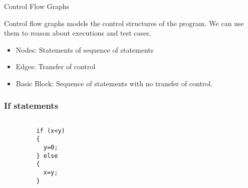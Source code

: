 \documentclass[handout]{beamer}
\begin{document}
 \begin{frame}{Control Flow Graphs}

Control flow graphs models the control structures of the program. We
can use them to reason about executions and test cases.
\begin{itemize}
\item Nodes: Statements of sequence of statements
\item Edges: Transfer of control
\item Basic Block: Sequence of statements with no transfer of control.
\end{itemize}
\end{frame}


\begin{frame}[fragile]%
\frametitle{If statements}
\begin{columns}
\begin{column}{0.5\textwidth}
\begin{lstlisting}
         if (x<y) 
         { 
           y=0; 
         } else
         {
           x=y;
         }
\end{lstlisting}
\end{column}
\begin{column}{0.5\textwidth}
\end{column}
\end{columns}
\end{frame}
\end{document}
